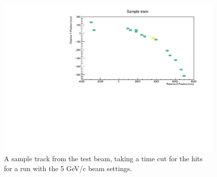 \begin{figure}[h!]
\centering
\includegraphics[width=\textwidth]{figures/SampleTrack5GeVYZ.pdf}
\caption{A sample track from the test beam, taking a time cut for the hits for a run with the 5 GeV/c beam settings.}
\label{fig:event}
\end{figure}

